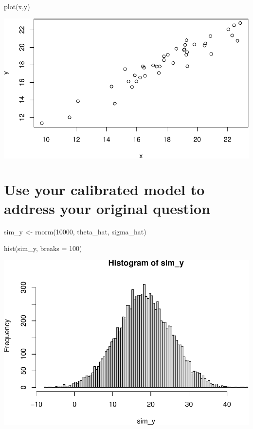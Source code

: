 \documentclass[
]{book}
\newenvironment{Shaded}{\begin{snugshade}}{\end{snugshade}}
\newcommand{\AttributeTok}[1]{\textcolor[rgb]{0.77,0.63,0.00}{#1}}
\newcommand{\DecValTok}[1]{\textcolor[rgb]{0.00,0.00,0.81}{#1}}
\newcommand{\FunctionTok}[1]{\textcolor[rgb]{0.00,0.00,0.00}{#1}}
\newcommand{\NormalTok}[1]{#1}
\newcommand{\OtherTok}[1]{\textcolor[rgb]{0.56,0.35,0.01}{#1}}
\begin{document}
\begin{Shaded}
\begin{Highlighting}[]
\FunctionTok{plot}\NormalTok{(x,y)}
\end{Highlighting}
\end{Shaded}

\includegraphics{graphics/unnamed-chunk-6-1.pdf}

\hypertarget{use-your-calibrated-model-to-address-your-original-question}{%
\section{Use your calibrated model to address your original question}\label{use-your-calibrated-model-to-address-your-original-question}}

\begin{Shaded}
\begin{Highlighting}[]
\NormalTok{sim\_y }\OtherTok{\textless{}{-}} \FunctionTok{rnorm}\NormalTok{(}\DecValTok{10000}\NormalTok{, theta\_hat, sigma\_hat)}

\FunctionTok{hist}\NormalTok{(sim\_y, }\AttributeTok{breaks =} \DecValTok{100}\NormalTok{)}
\end{Highlighting}
\end{Shaded}

\includegraphics{graphics/generate distribution of temp based on model results-1.pdf}
\end{document}
